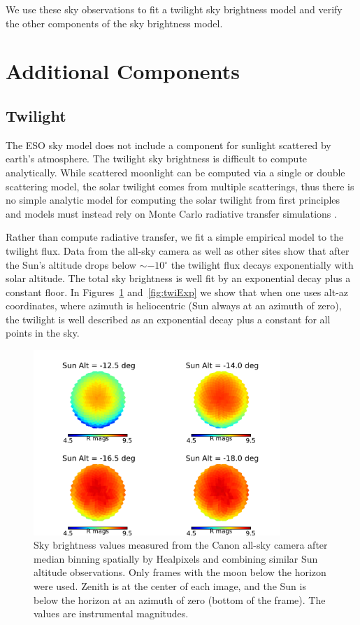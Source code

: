 \documentclass[]{spie}
\newcommand\degree{{^\circ}}
\begin{document}
We use these sky observations to fit a twilight sky brightness model and verify the other components of the sky brightness model.

\section{Additional Components}\label{sec:twi}
\subsection{Twilight}

The ESO sky model does not include a component for sunlight scattered by earth's atmosphere.  The twilight sky brightness is difficult to compute analytically.  While scattered moonlight can be computed via a single or double scattering model, the solar twilight comes from multiple scatterings, thus there is no simple analytic model for computing the solar twilight from first principles and models must instead rely on Monte Carlo radiative transfer simulations \cite{Patat06}.

Rather than compute radiative transfer, we fit a simple empirical model to the twilight flux.  Data from the all-sky camera as well as other sites show that after the Sun's altitude drops below $\sim-10\degree$ the twilight flux decays exponentially with solar altitude. The total sky brightness is well fit by an exponential decay plus a constant floor.  In Figures~\ref{fig:twiSky} and~\ref{fig:twiExp} we show that when one uses alt-az coordinates, where azimuth is heliocentric (Sun always at an azimuth of zero), the twilight is well described as an exponential decay plus a constant for all points in the sky.  %



\begin{figure}[ht]
  \begin{center}
  \includegraphics[height=7cm]{plots/twiExamples.pdf}
  \end{center}
  \caption{Sky brightness values measured from the Canon all-sky camera after median binning spatially by Healpixels and combining similar Sun altitude observations. Only frames with the moon below the horizon were used. Zenith is at the center of each image, and the Sun is below the horizon at an azimuth of zero (bottom of the frame). The values are instrumental magnitudes.  \label{fig:twiSky}}
\end{figure}
\end{document}
